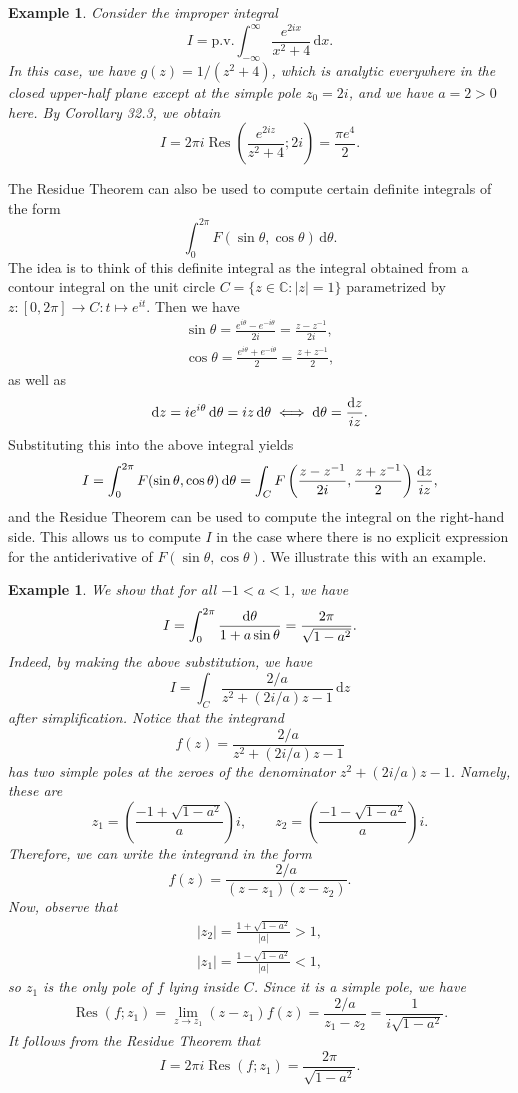 \documentclass[10pt]{article}
\newcommand{\C}{\mathbb{C}}
\newcommand{\dd}{\,\mathrm{d}}
\newcommand{\pv}{\text{p.v.}}
\DeclareMathOperator{\Res}{Res}
\theoremstyle{newstyle}
\newtheorem{exmp}[thm]{Example}
\begin{document}
\begin{exmp}
Consider the improper integral 
\[ I = \pv \int_{-\infty}^\infty \frac{e^{2ix}}{x^2+4}\dd x. \]
In this case, we have $g(z) = 1/(z^2+4)$, which is analytic everywhere in the closed upper-half 
plane except at the simple pole $z_0 = 2i$, and we have $a = 2 > 0$ here. By Corollary 32.3, we obtain 
\[ I = 2\pi i \Res \left( \frac{e^{2iz}}{z^2+4}; 2i \right) = \frac{\pi e^4}2. \]
\end{exmp}

The Residue Theorem can also be used to compute certain definite integrals of the form 
\[ \int_0^{2\pi} F(\sin\theta, \cos\theta)\dd \theta. \]
The idea is to think of this definite integral as the integral obtained from a contour 
integral on the unit circle $C = \{z \in \C : |z| = 1\}$ parametrized by 
$z : [0, 2\pi] \to C : t \mapsto e^{it}$. Then we have 
\begin{align*}
    \sin\theta = \frac{e^{i\theta} - e^{-i\theta}}{2i} = \frac{z-z^{-1}}{2i}, \\
    \cos\theta = \frac{e^{i\theta} + e^{-i\theta}}{2} = \frac{z+z^{-1}}{2}, 
\end{align*}
as well as 
\[ {\rm d}z = ie^{i\theta}\dd \theta = iz\dd\theta 
\iff {\rm d}\theta = \frac{{\rm d}z}{iz}. \]
Substituting this into the above integral yields
\[ I = \int_0^{2\pi} F(\sin\theta, \cos\theta) \dd\theta = \int_C F \left( \frac{z-z^{-1}}{2i}, 
\frac{z+z^{-1}}2 \right) \frac{{\rm d}z}{iz}, \]
and the Residue Theorem can be used to compute the integral on the right-hand side. This allows us 
to compute $I$ in the case where there is no explicit expression for the antiderivative of 
$F(\sin\theta, \cos\theta)$. We illustrate this with an example. 

\begin{exmp}
We show that for all $-1 < a < 1$, we have 
\[ I = \int_0^{2\pi} \frac{{\rm d}\theta}{1+a\sin\theta} = \frac{2\pi}{\sqrt{1-a^2}}. \]
Indeed, by making the above substitution, we have 
\[ I = \int_C \frac{2/a}{z^2 + (2i/a)z - 1}\dd z \]
after simplification. Notice that the integrand 
\[ f(z) = \frac{2/a}{z^2 + (2i/a)z - 1} \]
has two simple poles at the zeroes of the denominator $z^2 + (2i/a)z - 1$. Namely, these are 
\[ z_1 = \left( \frac{-1+\sqrt{1-a^2}}{a} \right)i, \quad\quad z_2 = \left( \frac{-1-\sqrt{1-a^2}}a \right)i. \]
Therefore, we can write the integrand in the form 
\[ f(z) = \frac{2/a}{(z-z_1)(z-z_2)}. \]
Now, observe that 
\begin{align*}
    |z_2| = \frac{1+\sqrt{1-a^2}}{|a|} > 1, \\
    |z_1| = \frac{1-\sqrt{1-a^2}}{|a|} < 1, 
\end{align*}
so $z_1$ is the only pole of $f$ lying inside $C$. Since it is a simple pole, we have 
\[ \Res(f; z_1) = \lim_{z\to z_1} (z-z_1)f(z) = \frac{2/a}{z_1 - z_2} = \frac{1}{i\sqrt{1-a^2}}. \]
It follows from the Residue Theorem that 
\[ I = 2\pi i \Res(f; z_1) = \frac{2\pi}{\sqrt{1-a^2}}. \]
\end{exmp}
\end{document}
